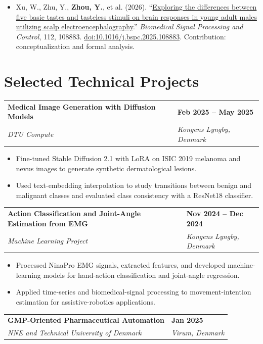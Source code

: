 \documentclass[a4paper,11pt]{article}
\makeatletter
\newcommand{\resumeSubheading}[4]{%
  \noindent
  \begin{tabularx}{\textwidth}{@{}X>{\raggedleft\arraybackslash}p{3.55cm}@{}}
    \textbf{#1} & \textbf{#2} \\
    \textit{#3} & \textit{#4}
  \end{tabularx}
  \vspace{0.02em}
}
\newcommand{\resumeItemListStart}{%
  \begin{itemize}[
    leftmargin=1.25em,
    label=\textendash,
    itemsep=0.20em,
    topsep=0.20em,
    parsep=0pt,
    partopsep=0pt
  ]
}
\newcommand{\resumeItemListEnd}{\end{itemize}}
\newcommand{\resumeItem}[1]{\item \small #1}
\makeatother
\begin{document}
\begin{itemize}[
  leftmargin=1.25em,
  label=\textbullet,
  itemsep=0.30em,
  topsep=0.20em,
  parsep=0pt
]
  \item \small
  Xu, W., Zhu, Y., \textbf{Zhou, Y.}, et al. (2026).
  ``\href{https://doi.org/10.1016/j.bspc.2025.108883}{Exploring the differences between five basic tastes and tasteless stimuli on brain responses in young adult males utilizing scalp electroencephalography}.''
  \textit{Biomedical Signal Processing and Control}, 112, 108883.
  \href{https://doi.org/10.1016/j.bspc.2025.108883}{doi:10.1016/j.bspc.2025.108883}.
  Contribution: conceptualization and formal analysis.
\end{itemize}

\newpage

\section{Selected Technical Projects}

\resumeSubheading
  {Medical Image Generation with Diffusion Models}
  {Feb 2025 -- May 2025}
  {DTU Compute}
  {Kongens Lyngby, Denmark}

\resumeItemListStart
  \resumeItem{Fine-tuned Stable Diffusion 2.1 with LoRA on ISIC 2019 melanoma and nevus images to generate synthetic dermatological lesions.}
  \resumeItem{Used text-embedding interpolation to study transitions between benign and malignant classes and evaluated class consistency with a ResNet18 classifier.}
\resumeItemListEnd

\vspace{0.28em}

\resumeSubheading
  {Action Classification and Joint-Angle Estimation from EMG}
  {Nov 2024 -- Dec 2024}
  {Machine Learning Project}
  {Kongens Lyngby, Denmark}

\resumeItemListStart
  \resumeItem{Processed NinaPro EMG signals, extracted features, and developed machine-learning models for hand-action classification and joint-angle regression.}
  \resumeItem{Applied time-series and biomedical-signal processing to movement-intention estimation for assistive-robotics applications.}
\resumeItemListEnd

\vspace{0.28em}

\resumeSubheading
  {GMP-Oriented Pharmaceutical Automation}
  {Jan 2025}
  {NNE and Technical University of Denmark}
  {Virum, Denmark}
\end{document}
